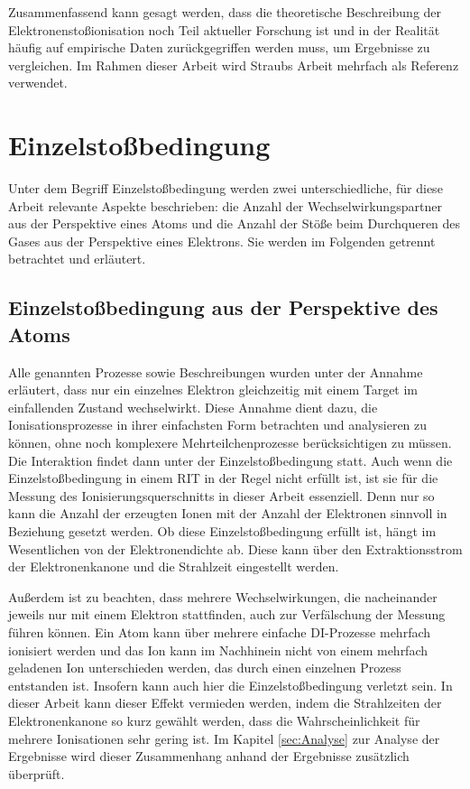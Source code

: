 Zusammenfassend kann gesagt werden, dass die theoretische Beschreibung der Elektronenstoßionisation noch Teil aktueller Forschung ist und in der Realität häufig auf empirische Daten zurückgegriffen werden muss, um Ergebnisse zu vergleichen. Im Rahmen dieser Arbeit wird Straubs Arbeit \cite{Straub} mehrfach als Referenz verwendet. 

\section{Einzelstoßbedingung}
\label{chap:Einzelstoß}
Unter dem Begriff Einzelstoßbedingung werden zwei unterschiedliche, für diese Arbeit relevante Aspekte beschrieben: die Anzahl der Wechselwirkungspartner aus der Perspektive eines Atoms und die Anzahl der Stöße beim Durchqueren des Gases aus der Perspektive eines Elektrons. Sie werden im Folgenden getrennt betrachtet und erläutert.

\subsection{Einzelstoßbedingung aus der Perspektive des Atoms}
Alle genannten Prozesse sowie Beschreibungen wurden unter der Annahme erläutert, dass nur ein einzelnes Elektron gleichzeitig mit einem Target im einfallenden Zustand wechselwirkt. Diese Annahme dient dazu, die Ionisationsprozesse in ihrer einfachsten Form betrachten und analysieren zu können, ohne noch komplexere Mehrteilchenprozesse berücksichtigen zu müssen. Die Interaktion findet dann unter der Einzelstoßbedingung statt. Auch wenn die Einzelstoßbedingung in einem RIT in der Regel nicht erfüllt ist, ist sie für die Messung des Ionisierungsquerschnitts in dieser Arbeit essenziell. Denn nur so kann die Anzahl der erzeugten Ionen mit der Anzahl der Elektronen sinnvoll in Beziehung gesetzt werden. Ob diese Einzelstoßbedingung erfüllt ist, hängt im Wesentlichen von der Elektronendichte ab. Diese kann über den Extraktionsstrom der Elektronenkanone und die Strahlzeit eingestellt werden.

Außerdem ist zu beachten, dass mehrere Wechselwirkungen, die nacheinander jeweils nur mit einem Elektron stattfinden, auch zur Verfälschung der Messung führen können. Ein Atom kann über mehrere einfache DI-Prozesse mehrfach ionisiert werden und das Ion kann im Nachhinein nicht von einem mehrfach geladenen Ion unterschieden werden, das durch einen einzelnen Prozess entstanden ist. Insofern kann auch hier die Einzelstoßbedingung verletzt sein. In dieser Arbeit kann dieser Effekt vermieden werden, indem die Strahlzeiten der Elektronenkanone so kurz gewählt werden, dass die Wahrscheinlichkeit für mehrere Ionisationen sehr gering ist. Im Kapitel \ref{sec:Analyse} zur Analyse der Ergebnisse wird dieser Zusammenhang anhand der Ergebnisse zusätzlich überprüft.

